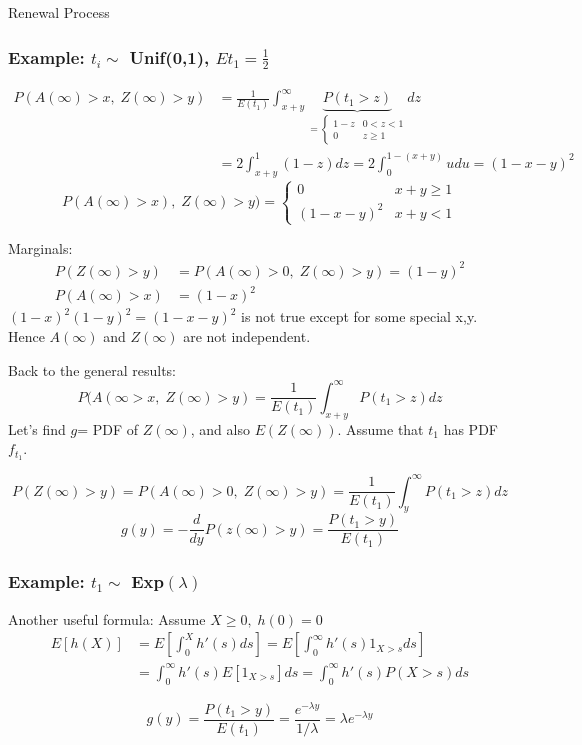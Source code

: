 \documentclass[12pt]{article}
\begin{document}
\begin{section}{Renewal Process}
\subsubsection{Example: $t_i\sim$ Unif(0,1), $Et_1 = \frac{1}{2}$}
\begin{align}
    P(A(\infty)>x,\;Z(\infty)>y) & = \frac{1}{E(t_1)}\int_{x+y}^\infty \underbrace{P(t_1>z)}_{=\begin{cases}1-z & 0<z<1 \\ 0&z\ge 1 \end{cases}}dz \nonumber \\
    &=2\int_{x+y}^1(1-z)dz = 2\int_0^{1-(x+y)}u du = (1-x-y)^2 \nonumber
\end{align}
$$P(A(\infty)>x),\;Z(\infty)>y)=\begin{cases}
0&x+y\ge 1\\ (1-x-y)^2 & x+y <1
\end{cases}$$

Marginals:
\begin{align}
    P(Z(\infty)>y) & = P(A(\infty)>0,\;Z(\infty)>y) = (1-y)^2 \nonumber \\
    P(A(\infty)>x)&= (1-x)^2 \nonumber
\end{align}
$(1-x)^2(1-y)^2 = (1-x-y)^2$ is not true except for some special x,y. Hence $A(\infty)$ and $Z(\infty)$ are not independent.

\vspace{2\baselineskip}
Back to the general results:
$$P(A(\infty>x,\;Z(\infty)>y) = \frac{1}{E(t_1)}\int_{x+y}^\infty P(t_1>z)dz$$
Let's find $g$= PDF of $Z(\infty)$, and also $E(Z(\infty)).$ Assume that $t_1$ has PDF $f_{t_1}$.

$$P(Z(\infty)>y) = P(A(\infty)>0,\;Z(\infty)>y) = \frac{1}{E(t_1)}\int_y^\infty P(t_1>z)dz$$
$$g(y) = -\frac{d}{dy}P(z(\infty)>y) = \frac{P(t_1>y)}{E(t_1)}$$

\subsubsection{Example: $t_1\sim$ Exp$(\lambda)$}
Another useful formula: Assume $X\ge 0,\; h(0)=0$
\begin{align}
    E[h(X)] &= E\left[\int_0^X h'(s)ds\right] = E\left[\int_0^\infty h'(s) 1_{X>s}ds \right]\nonumber \\
    &=\int_0^\infty h'(s)E[1_{X>s}]ds = \int_0^\infty h'(s)P(X>s) ds \nonumber
\end{align}

\vspace{1\baselineskip}
$$g(y) = \frac{P(t_1>y)}{E(t_1)} = \frac{e^{-\lambda y}}{1/\lambda} = \lambda e^{-\lambda y}$$


\end{section}
\end{document}
